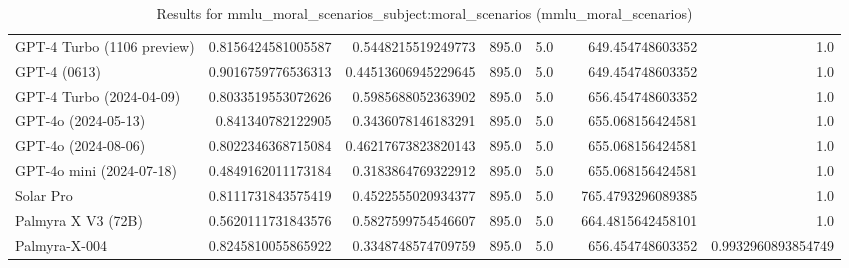 \begin{table}[htp]
{\begin{tabular}{lrrrrrrr}
GPT-4 Turbo (1106 preview) & 0.8156424581005587 & 0.5448215519249773 & 895.0 & 5.0 &  & 649.454748603352 & 1.0 \\
GPT-4 (0613) & 0.9016759776536313 & 0.44513606945229645 & 895.0 & 5.0 &  & 649.454748603352 & 1.0 \\
GPT-4 Turbo (2024-04-09) & 0.8033519553072626 & 0.5985688052363902 & 895.0 & 5.0 &  & 656.454748603352 & 1.0 \\
GPT-4o (2024-05-13) & 0.841340782122905 & 0.3436078146183291 & 895.0 & 5.0 &  & 655.068156424581 & 1.0 \\
GPT-4o (2024-08-06) & 0.8022346368715084 & 0.46217673823820143 & 895.0 & 5.0 &  & 655.068156424581 & 1.0 \\
GPT-4o mini (2024-07-18) & 0.4849162011173184 & 0.3183864769322912 & 895.0 & 5.0 &  & 655.068156424581 & 1.0 \\
Solar Pro & 0.8111731843575419 & 0.4522555020934377 & 895.0 & 5.0 &  & 765.4793296089385 & 1.0 \\
Palmyra X V3 (72B) & 0.5620111731843576 & 0.5827599754546607 & 895.0 & 5.0 &  & 664.4815642458101 & 1.0 \\
Palmyra-X-004 & 0.8245810055865922 & 0.3348748574709759 & 895.0 & 5.0 &  & 656.454748603352 & 0.9932960893854749 \\
\bottomrule
\end{tabular}}
\caption{Results for mmlu_moral_scenarios_subject:moral_scenarios (mmlu_moral_scenarios)}
\label{fig:mmlu_moral_scenarios_subject:moral_scenarios (mmlu_moral_scenarios)}
\end{table}